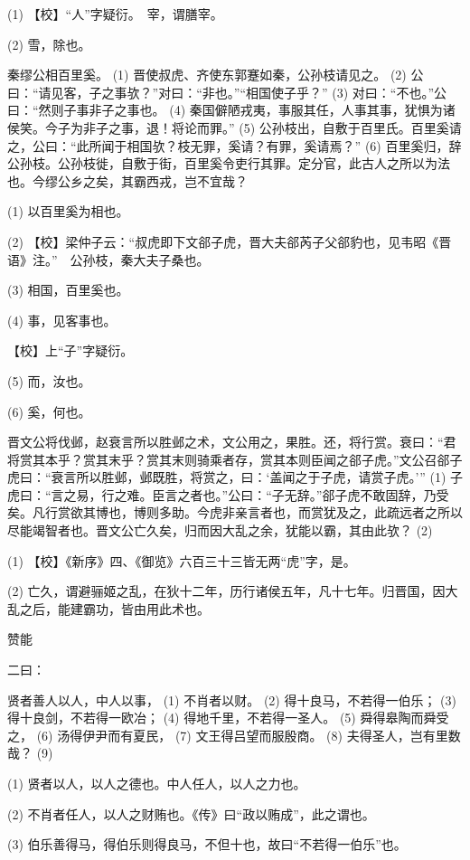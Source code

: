 \documentclass[12pt,UTF8]{ctexbook}
\begin{document}
(1) 【校】“人”字疑衍。　宰，谓膳宰。

(2) 雪，除也。

秦缪公相百里奚。 (1) 晋使叔虎、齐使东郭蹇如秦，公孙枝请见之。 (2) 公曰：“请见客，子之事欤？”对曰：“非也。”“相国使子乎？” (3) 对曰：“不也。”公曰：“然则子事非子之事也。 (4) 秦国僻陋戎夷，事服其任，人事其事，犹惧为诸侯笑。今子为非子之事，退！将论而罪。” (5) 公孙枝出，自敷于百里氏。百里奚请之，公曰：“此所闻于相国欤？枝无罪，奚请？有罪，奚请焉？” (6) 百里奚归，辞公孙枝。公孙枝徙，自敷于街，百里奚令吏行其罪。定分官，此古人之所以为法也。今缪公乡之矣，其霸西戎，岂不宜哉？

(1) 以百里奚为相也。

(2) 【校】梁仲子云：“叔虎即下文郤子虎，晋大夫郤芮子父郤豹也，见韦昭《晋语》注。”　公孙枝，秦大夫子桑也。

(3) 相国，百里奚也。

(4) 事，见客事也。

【校】上“子”字疑衍。

(5) 而，汝也。

(6) 奚，何也。

晋文公将伐邺，赵衰言所以胜邺之术，文公用之，果胜。还，将行赏。衰曰：“君将赏其本乎？赏其末乎？赏其末则骑乘者存，赏其本则臣闻之郤子虎。”文公召郤子虎曰：“衰言所以胜邺，邺既胜，将赏之，曰：‘盖闻之于子虎，请赏子虎。’” (1) 子虎曰：“言之易，行之难。臣言之者也。”公曰：“子无辞。”郤子虎不敢固辞，乃受矣。凡行赏欲其博也，博则多助。今虎非亲言者也，而赏犹及之，此疏远者之所以尽能竭智者也。晋文公亡久矣，归而因大乱之余，犹能以霸，其由此欤？ (2)

(1) 【校】《新序》四、《御览》六百三十三皆无两“虎”字，是。

(2) 亡久，谓避骊姬之乱，在狄十二年，历行诸侯五年，凡十七年。归晋国，因大乱之后，能建霸功，皆由用此术也。





赞能


二曰：

贤者善人以人，中人以事， (1) 不肖者以财。 (2) 得十良马，不若得一伯乐； (3) 得十良剑，不若得一欧冶； (4) 得地千里，不若得一圣人。 (5) 舜得皋陶而舜受之， (6) 汤得伊尹而有夏民， (7) 文王得吕望而服殷商。 (8) 夫得圣人，岂有里数哉？ (9)

(1) 贤者以人，以人之德也。中人任人，以人之力也。

(2) 不肖者任人，以人之财贿也。《传》曰“政以贿成”，此之谓也。

(3) 伯乐善得马，得伯乐则得良马，不但十也，故曰“不若得一伯乐”也。
\end{document}
